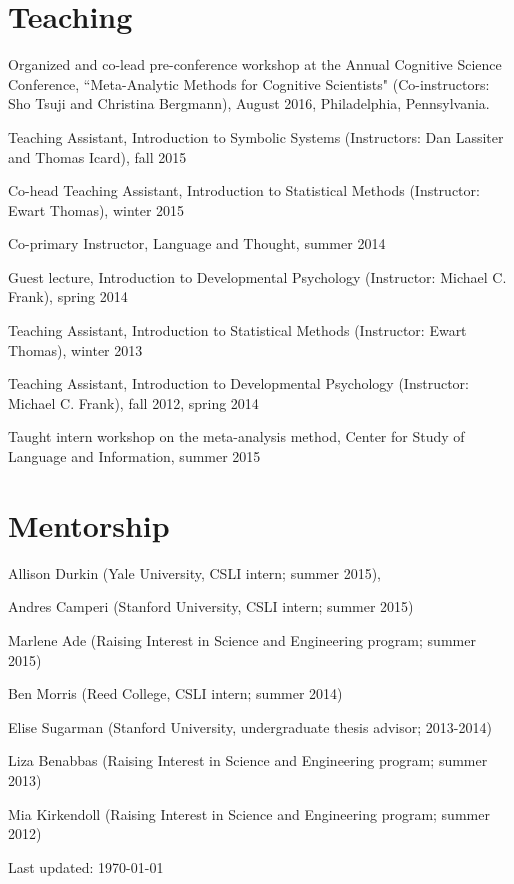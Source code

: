 \documentclass[letterpaper]{article}
\def\footerlink{}
\renewenvironment{itemize}{
  \begin{list}{}{
    \setlength{\leftmargin}{1.5em}
  }
}{
  \end{list}
}
\begin{document}
\section*{Teaching}
\begin{itemize}
\item Organized and co-lead pre-conference workshop at the Annual Cognitive Science Conference, ``Meta-Analytic Methods for Cognitive Scientists" (Co-instructors: Sho Tsuji and Christina Bergmann), August 2016, Philadelphia, Pennsylvania. 
\item Teaching Assistant, Introduction to Symbolic Systems (Instructors: Dan Lassiter and Thomas Icard), fall 2015
\item Co-head Teaching Assistant, Introduction to Statistical Methods (Instructor: Ewart Thomas), winter 2015
\item Co-primary Instructor, Language and Thought, summer 2014
\item Guest lecture, Introduction to Developmental Psychology (Instructor: Michael C. Frank), spring 2014
\item Teaching Assistant, Introduction to Statistical Methods (Instructor: Ewart Thomas), winter 2013
\item Teaching Assistant, Introduction to Developmental Psychology (Instructor: Michael C. Frank), fall 2012, spring 2014
\item Taught intern workshop on the meta-analysis method, Center for Study of Language and Information, summer 2015

\end{itemize}

\section*{Mentorship}
\begin{itemize}
\item Allison Durkin (Yale University, CSLI intern; summer 2015), 
\item Andres Camperi (Stanford University, CSLI intern; summer 2015)
\item Marlene Ade (Raising Interest in Science and Engineering program; summer 2015)
\item Ben Morris (Reed College, CSLI intern; summer 2014)
\item Elise Sugarman (Stanford University, undergraduate thesis advisor; 2013-2014)
\item Liza Benabbas (Raising Interest in Science and Engineering program; summer 2013)
\item Mia Kirkendoll (Raising Interest in Science and Engineering program; summer 2012)

\end{itemize}


\bigskip

\begin{center}
  \begin{footnotesize}
    Last updated: \today \\
    \href{\footerlink}{\texttt{\footerlink}}
  \end{footnotesize}
\end{center}
\end{document}
